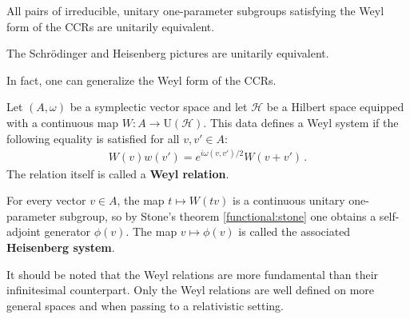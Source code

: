     \begin{theorem}\label{qm_formalism:stone_von_neumann}
        All pairs of irreducible, unitary one-parameter subgroups satisfying the Weyl form of the CCRs are unitarily equivalent.
    \end{theorem}
    \begin{result}
        The Schr\"odinger and Heisenberg pictures are unitarily equivalent.
    \end{result}

    In fact, one can generalize the Weyl form of the CCRs.
    \begin{definition}
        Let $(A,\omega)$ be a symplectic vector space and let $\mathcal{H}$ be a Hilbert space equipped with a continuous map $W:A\rightarrow\mathrm{U}(\mathcal{H})$. This data defines a Weyl system if the following equality is satisfied for all $v,v'\in A$:
        \begin{gather}
            W(v)w(v')=e^{i\omega(v,v')/2}W(v+v')\,.
        \end{gather}
        The relation itself is called a \textbf{Weyl relation}.

        For every vector $v\in A$, the map $t\mapsto W(tv)$ is a continuous unitary one-parameter subgroup, so by Stone's theorem \ref{functional:stone} one obtains a self-adjoint generator $\phi(v)$. The map $v\mapsto\phi(v)$ is called the associated \textbf{Heisenberg system}.
    \end{definition}
    \begin{remark}
        It should be noted that the Weyl relations are more fundamental than their infinitesimal counterpart. Only the Weyl relations are well defined on more general spaces and when passing to a relativistic setting.
    \end{remark}

